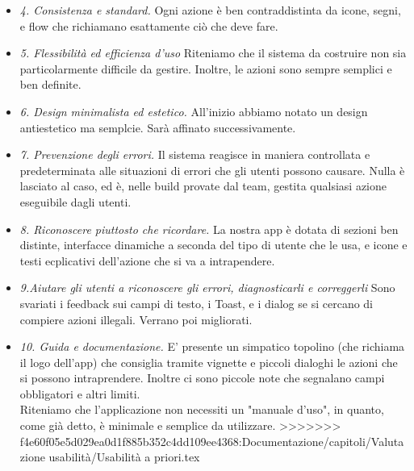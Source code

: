 \begin{flushleft}
\begin{itemize}
            \item  \emph{4. Consistenza e standard.} Ogni azione è ben contraddistinta da icone, segni, e flow che richiamano esattamente ciò che deve fare. 
            \item  \emph{5. Flessibilità ed efficienza d’uso} Riteniamo che il sistema da costruire non sia particolarmente difficile da gestire. Inoltre, le azioni sono sempre semplici e ben definite.
            \item  \emph{6. Design minimalista ed estetico.} All'inizio abbiamo notato un design antiestetico ma semplcie. Sarà affinato successivamente.
            \item  \emph{7. Prevenzione degli errori.} Il sistema reagisce in maniera controllata e predeterminata alle situazioni di errori che gli utenti possono causare. Nulla è lasciato al caso, ed è, nelle build provate dal team, gestita qualsiasi azione eseguibile dagli utenti.
            \item  \emph{8. Riconoscere piuttosto che ricordare.} La nostra app è dotata di sezioni ben distinte, interfacce dinamiche a seconda del tipo di utente che le usa, e icone e testi ecplicativi dell'azione che si va a intrapendere.
            \item \emph{9.Aiutare gli utenti a riconoscere gli errori, diagnosticarli e correggerli} Sono svariati i feedback sui campi di testo, i Toast, e i dialog se si cercano di compiere azioni illegali. Verrano poi migliorati.
            \item  \emph{10. Guida e documentazione.} E' presente un simpatico topolino (che richiama il logo dell'app) che consiglia tramite vignette e piccoli dialoghi le azioni che si possono intraprendere. Inoltre ci sono piccole note che segnalano campi obbligatori e altri limiti.\\
            Riteniamo che l'applicazione non necessiti un "manuale d'uso", in quanto, come già detto, è minimale e semplice da utilizzare.
>>>>>>> f4e60f05e5d029ea0d1f885b352c4dd109ee4368:Documentazione/capitoli/Valutazione usabilità/Usabilità a priori.tex
        \end{itemize}
    \end{flushleft}

